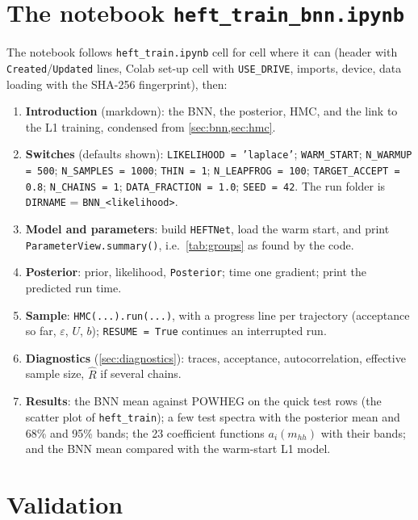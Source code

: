 \documentclass[11pt]{article}
\newcommand{\file}[1]{\nolinkurl{#1}}
\newcommand{\code}[1]{\texttt{#1}}
\newcommand{\mhh}{m_{hh}}
\begin{document}
\section{The notebook \texttt{heft\_train\_bnn.ipynb}}
\label{sec:notebook}

The notebook follows \file{heft_train.ipynb} cell for cell where it can (header with
\code{Created}/\code{Updated} lines, Colab set-up cell with \code{USE\_DRIVE},
imports, device, data loading with the SHA-256 fingerprint), then:

\begin{enumerate}
  \item \textbf{Introduction} (markdown): the BNN, the posterior, HMC, and the link to
    the L1 training, condensed from \cref{sec:bnn,sec:hmc}.
  \item \textbf{Switches} (defaults shown): \code{LIKELIHOOD = 'laplace'};
    \code{WARM\_START}; \code{N\_WARMUP = 500}; \code{N\_SAMPLES = 1000};
    \code{THIN = 1}; \code{N\_LEAPFROG = 100}; \code{TARGET\_ACCEPT = 0.8};
    \code{N\_CHAINS = 1}; \code{DATA\_FRACTION = 1.0}; \code{SEED = 42}.
    The run folder is \code{DIRNAME} = \file{BNN_<likelihood>}.
  \item \textbf{Model and parameters}: build \code{HEFTNet}, load the warm start, and
    print \code{ParameterView.summary()}, i.e.\ \cref{tab:groups} as found by the code.
  \item \textbf{Posterior}: prior, likelihood, \code{Posterior}; time one gradient;
    print the predicted run time.
  \item \textbf{Sample}: \code{HMC(...).run(...)}, with a progress line per
    trajectory (acceptance so far, $\varepsilon$, $U$, $b$); \code{RESUME = True}
    continues an interrupted run.
  \item \textbf{Diagnostics} (\cref{sec:diagnostics}): traces, acceptance,
    autocorrelation, effective sample size, $\hat R$ if several chains.
  \item \textbf{Results}: the BNN mean against POWHEG on the quick test rows (the
    scatter plot of \file{heft_train}); a few test spectra with the posterior mean and
    68\% and 95\% bands; the 23 coefficient functions $a_i(\mhh)$ with their bands;
    and the BNN mean compared with the warm-start L1 model.
\end{enumerate}

\section{Validation}
\label{sec:validation}
\end{document}
